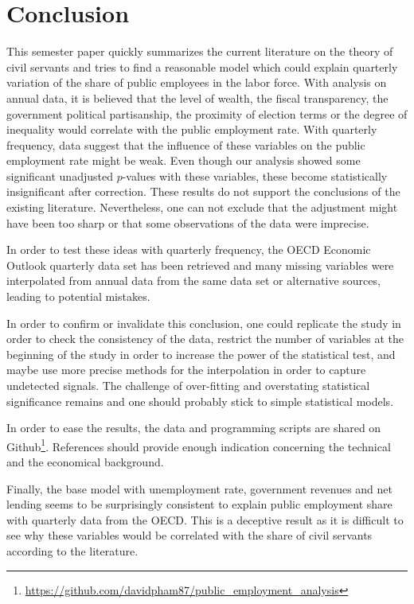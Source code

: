 \chapter{Conclusion}

This semester paper quickly summarizes the current literature on the theory of
civil servants and tries to find a reasonable model which could explain
quarterly variation of the share of public employees in the labor force. With
analysis on annual data, it is believed that the level of wealth, the fiscal
transparency, the government political partisanship, the proximity of election
terms or the degree of inequality would correlate with the public employment
rate. With quarterly frequency, data suggest that the influence of these
variables on the public employment rate might be weak. Even though our analysis
showed some significant unadjusted $p$-values with these variables, these
become statistically insignificant after correction. These results do not
support the conclusions of the existing literature. Nevertheless, one can not
exclude that the adjustment might have been too sharp or that some observations
of the data were imprecise.

In order to test these ideas with quarterly frequency, the OECD Economic
Outlook quarterly data set has been retrieved and many missing variables were
interpolated from annual data from the same data set or alternative sources,
leading to potential mistakes.

In order to confirm or invalidate this conclusion, one could replicate the
study in order to check the consistency of the data, restrict the number
of variables at the beginning of the study in order to increase the power of the
statistical test, and maybe use more precise methods for the interpolation in
order to capture undetected signals. The challenge of over-fitting and
overstating statistical significance remains and one should probably stick to
simple statistical models.

In order to ease the results, the data and programming scripts are shared on
Github\footnote{\url{https://github.com/davidpham87/public_employment_analysis}}.
References should provide enough indication concerning the technical and the
economical background.

Finally, the base model with unemployment rate, government revenues and net
lending seems to be surprisingly consistent to explain public employment share
with quarterly data from the OECD. This is a deceptive result as it is
difficult to see why these variables would be correlated with the share of
civil servants according to the literature.


